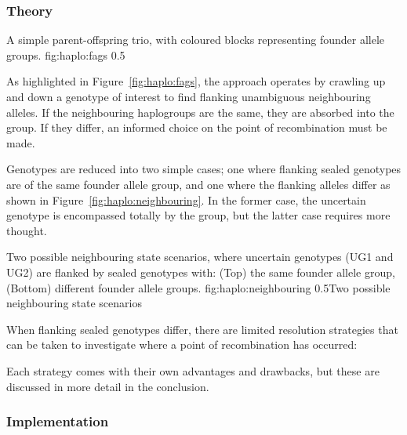 \subsubsection{Theory}

	{A simple parent-offspring trio, with coloured blocks representing founder allele groups.}
	{fig:haplo:fags}
	{0.5}{}



As highlighted in Figure~\ref{fig:haplo:fags}, the approach operates by crawling up and down a genotype of interest to find flanking unambiguous neighbouring alleles. If the neighbouring haplogroups are the same, they are absorbed into the group. If they differ, an informed choice on the point of recombination must be made.

Genotypes are reduced into two simple cases; one where flanking sealed genotypes are of the same founder allele group, and one where the flanking alleles differ as shown in Figure~\ref{fig:haplo:neighbouring}. In the former case, the uncertain genotype is encompassed totally by the group, but the latter case requires more thought.

	{Two possible neighbouring state scenarios, where uncertain genotypes (UG1 and UG2) are flanked by sealed genotypes with: (Top) the same founder allele group, (Bottom) different founder allele groups.}
	{fig:haplo:neighbouring}
	{0.5}{Two possible neighbouring state scenarios}

When flanking sealed genotypes differ, there are limited resolution strategies that can be taken to investigate where a point of recombination has occurred:

\begin{enumerate}

Each strategy comes with their own advantages and drawbacks, but these are discussed in more detail in the conclusion.
\end{enumerate}

\subsubsection{Implementation}

